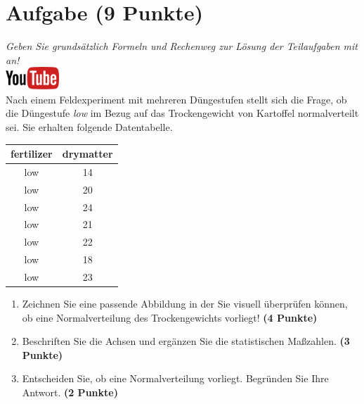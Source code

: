 \documentclass[a4paper, 10pt]{scrartcl}\usepackage[]{graphicx}\usepackage[]{xcolor}
\begin{document}
\section{Aufgabe \hfill (9 Punkte)}

\textit{Geben Sie grunds{\"a}tzlich Formeln und Rechenweg zur L{\"o}sung der
  Teilaufgaben mit an!} \\[1Ex]

\hfill\href{https://youtu.be/VX4Hs81h8_A}{\includegraphics[width =
  2cm]{img/youtube}}\\[1Ex]



Nach einem Feldexperiment mit mehreren D{\"u}ngestufen stellt sich die Frage,
ob die D{\"u}ngestufe \textit{low} im Bezug auf das Trockengewicht von Kartoffel
normalverteilt sei. Sie erhalten folgende Datentabelle.

\begin{table}[!h]
\centering
\begin{tabular}{cc}
\toprule
fertilizer & drymatter\\
\midrule
low & 14\\
low & 20\\
low & 24\\
low & 21\\
low & 22\\
\addlinespace
low & 18\\
low & 23\\
\bottomrule
\end{tabular}
\end{table}



\begin{enumerate}
\item Zeichnen Sie eine passende Abbildung in der Sie visuell {\"u}berpr{\"u}fen
  k{\"o}nnen, ob eine Normalverteilung des Trockengewichts vorliegt! \textbf{(4
    Punkte)}
\item Beschriften Sie die Achsen und erg{\"a}nzen Sie die statistischen
  Ma{\ss}zahlen. \textbf{(3 Punkte)}
\item Entscheiden Sie, ob eine Normalverteilung vorliegt. Begr{\"u}nden Sie Ihre
  Antwort. \textbf{(2 Punkte)}
\end{enumerate} 
\clearpage
\end{document}
